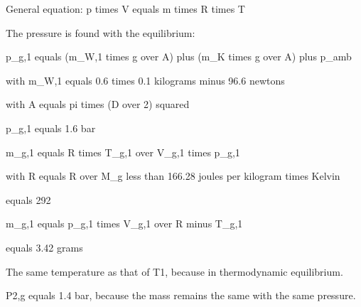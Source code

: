 General equation: p times V equals m times R times T

The pressure is found with the equilibrium:

p_g,1 equals (m_W,1 times g over A) plus (m_K times g over A) plus p_amb

with m_W,1 equals 0.6 times 0.1 kilograms
minus 96.6 newtons

with A equals pi times (D over 2) squared

p_g,1 equals 1.6 bar

m_g,1 equals R times T_g,1 over V_g,1 times p_g,1

with R equals R over M_g less than 166.28 joules per kilogram times Kelvin

equals 292

m_g,1 equals p_g,1 times V_g,1 over R minus T_g,1

equals 3.42 grams

The same temperature as that of T1, because in thermodynamic equilibrium.

P2,g equals 1.4 bar, because the mass remains the same with the same pressure.